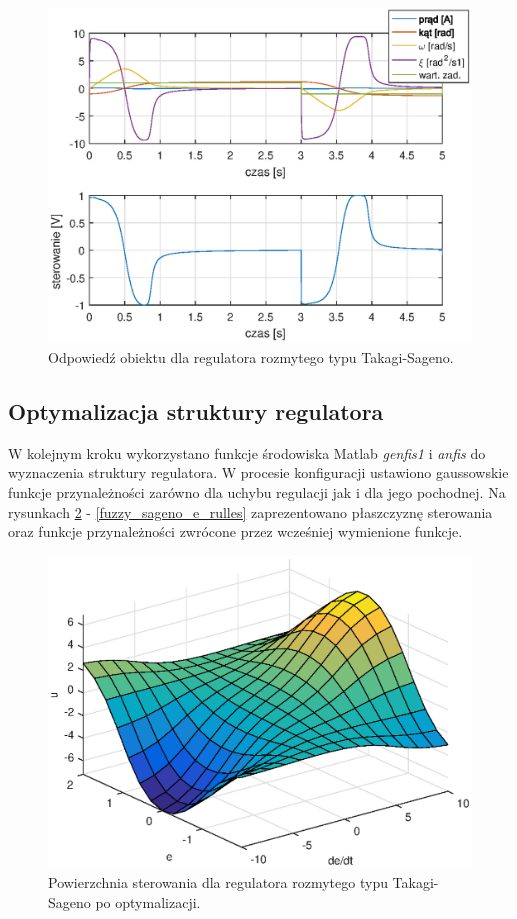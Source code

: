 \begin{figure}[h!]
	\centering
	\includegraphics[scale = 0.8]{fig/fuzzy_sagenoMan_odp.eps}
	\caption		
	{Odpowied\'z obiektu dla regulatora rozmytego typu Takagi-Sageno.}
	\label{fuzzy_sageno_man}
\end{figure}
\FloatBarrier
\newpage

\subsection{Optymalizacja struktury regulatora}
W kolejnym kroku wykorzystano funkcje środowiska Matlab \textit{genfis1} i \textit{anfis} do wyznaczenia struktury regulatora. W procesie konfiguracji ustawiono gaussowskie funkcje przynależności zarówno dla uchybu regulacji jak i dla jego pochodnej. Na rysunkach \ref{fuzzy_sageno_sufrace} - \ref{fuzzy_sageno_e_rulles} zaprezentowano płaszczyznę sterowania oraz funkcje przynależności zwrócone przez wcześniej wymienione funkcje.
\begin{figure}[h!]
	\centering
	\includegraphics[scale = 0.8]{fig/sagenoOptSurface.eps}
	\caption		
	{Powierzchnia sterowania dla regulatora rozmytego typu Takagi-Sageno po optymalizacji.}
	\label{fuzzy_sageno_sufrace}
\end{figure}

